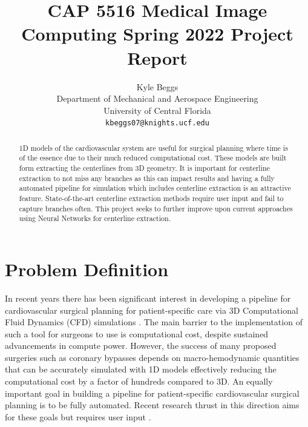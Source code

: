 \documentclass[10pt,twocolumn,letterpaper]{article}
\begin{document}
\title{CAP 5516 Medical Image Computing Spring 2022 Project Report}

\author{Kyle Beggs\\
Department of Mechanical and Aerospace Engineering\\ 
University of Central Florida\\
{\tt\small kbeggs07@knights.ucf.edu}}

\maketitle
\ificcvfinal\thispagestyle{empty}\fi


\begin{abstract}
    1D models of the cardiovascular system are useful for surgical planning where time is of the essence due to their much reduced computational cost. These models are built form extracting the centerlines from 3D geometry. It is important for centerline extraction to not miss any branches as this can impact results and having a fully automated pipeline for simulation which includes centerline extraction is an attractive feature. State-of-the-art centerline extraction methods require user input and fail to capture branches often. This project seeks to further improve upon current approaches using Neural Networks for centerline extraction.
\end{abstract}


\section{Problem Definition}

In recent years there has been significant interest in developing a pipeline for cardiovascular surgical planning for patient-specific care via 3D Computational Fluid Dynamics (CFD) simulations \cite{morrisonAdvancingRegulatoryScience2018}. The main barrier to the implementation of such a tool for surgeons to use is computational cost, despite sustained advancements in compute power. However, the success of many proposed surgeries such as coronary bypasses depends on macro-hemodynamic quantities that can be accurately simulated with 1D models effectively reducing the computational cost by a factor of hundreds compared to 3D. An equally important goal in building a pipeline for patient-specific cardiovascular surgical planning is to be fully automated. Recent research thrust in this direction aims for these goals but requires user input \cite{pfallerAutomatedGeneration0D2021}.
 
\end{document}
